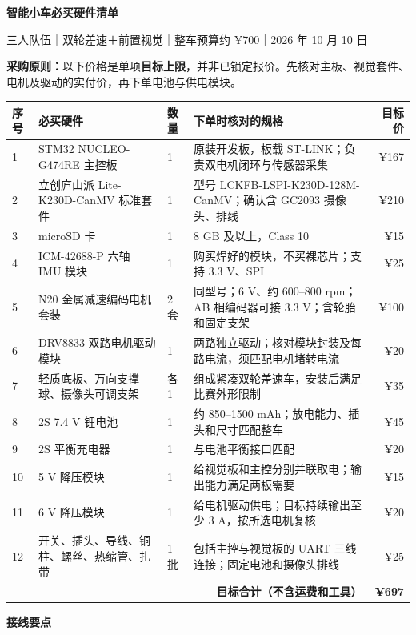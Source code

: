 \documentclass[UTF8,a4paper,10pt]{ctexart}
\begin{document}
{\LARGE\bfseries 智能小车必买硬件清单}\par
\vspace{2mm}
三人队伍｜双轮差速＋前置视觉｜整车预算约 ¥700｜2026 年 10 月 10 日\par
\vspace{2mm}
\colorbox{gray!12}{\parbox{\dimexpr\linewidth-2\fboxsep}{\textbf{采购原则：}以下价格是单项\textbf{目标上限}，并非已锁定报价。先核对主板、视觉套件、电机及驱动的实付价，再下单电池与供电模块。}}\par
\vspace{3mm}
\small
\begin{longtable}{p{1.0cm}p{4.1cm}p{1.0cm}p{7.0cm}r}
\toprule
序号 & 必买硬件 & 数量 & 下单时核对的规格 & 目标价\\
\midrule
1 & STM32 NUCLEO-G474RE 主控板 & 1 & 原装开发板，板载 ST-LINK；负责双电机闭环与传感器采集 & ¥167\\
2 & 立创庐山派 Lite-K230D-CanMV 标准套件 & 1 & 型号 LCKFB-LSPI-K230D-128M-CanMV；确认含 GC2093 摄像头、排线 & ¥210\\
3 & microSD 卡 & 1 & 8 GB 及以上，Class 10 & ¥15\\
4 & ICM-42688-P 六轴 IMU 模块 & 1 & 购买焊好的模块，不买裸芯片；支持 3.3 V、SPI & ¥25\\
5 & N20 金属减速编码电机套装 & 2 套 & 同型号；6 V、约 600--800 rpm；AB 相编码器可接 3.3 V；含轮胎和固定支架 & ¥100\\
6 & DRV8833 双路电机驱动模块 & 1 & 两路独立驱动；核对模块封装及每路电流，须匹配电机堵转电流 & ¥20\\
7 & 轻质底板、万向支撑球、摄像头可调支架 & 各 1 & 组成紧凑双轮差速车，安装后满足比赛外形限制 & ¥35\\
8 & 2S 7.4 V 锂电池 & 1 & 约 850--1500 mAh；放电能力、插头和尺寸匹配整车 & ¥45\\
9 & 2S 平衡充电器 & 1 & 与电池平衡接口匹配 & ¥20\\
10 & 5 V 降压模块 & 1 & 给视觉板和主控分别并联取电；输出能力满足两板需要 & ¥15\\
11 & 6 V 降压模块 & 1 & 给电机驱动供电；目标持续输出至少 3 A，按所选电机复核 & ¥20\\
12 & 开关、插头、导线、铜柱、螺丝、热缩管、扎带 & 1 批 & 包括主控与视觉板的 UART 三线连接；固定电池和摄像头排线 & ¥25\\
\midrule
\multicolumn{4}{r}{\textbf{目标合计（不含运费和工具）}} & \textbf{¥697}\\
\bottomrule
\end{longtable}
\normalsize
\textbf{接线要点}\par
\end{document}
